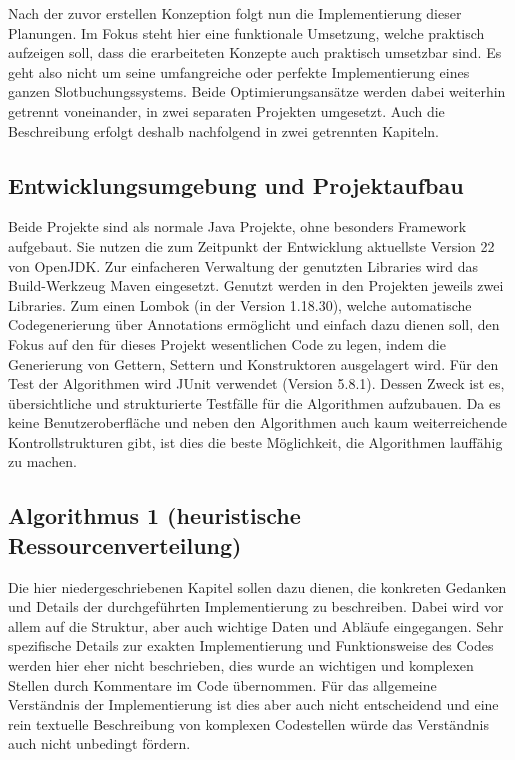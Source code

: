 
Nach der zuvor erstellen Konzeption folgt nun die Implementierung dieser Planungen. Im Fokus steht hier eine funktionale Umsetzung, welche praktisch aufzeigen soll, dass die erarbeiteten Konzepte auch praktisch umsetzbar sind. Es geht also nicht um seine umfangreiche oder perfekte Implementierung eines ganzen Slotbuchungssystems. Beide Optimierungsansätze werden dabei weiterhin getrennt voneinander, in zwei separaten Projekten umgesetzt. Auch die Beschreibung erfolgt deshalb nachfolgend in zwei getrennten Kapiteln.

\subsection{Entwicklungsumgebung und Projektaufbau}

Beide Projekte sind als normale Java Projekte, ohne besonders Framework aufgebaut. Sie nutzen die zum Zeitpunkt der Entwicklung aktuellste Version 22 von OpenJDK. Zur einfacheren Verwaltung der genutzten Libraries wird das Build-Werkzeug Maven eingesetzt. Genutzt werden in den Projekten jeweils zwei Libraries. Zum einen Lombok (in der Version 1.18.30), welche automatische Codegenerierung über Annotations ermöglicht und einfach dazu dienen soll, den Fokus auf den für dieses Projekt wesentlichen Code zu legen, indem die Generierung von Gettern, Settern und Konstruktoren ausgelagert wird. Für den Test der Algorithmen wird JUnit verwendet (Version 5.8.1). Dessen Zweck ist es, übersichtliche und strukturierte Testfälle für die Algorithmen aufzubauen. Da es keine Benutzeroberfläche und neben den Algorithmen auch kaum weiterreichende Kontrollstrukturen gibt, ist dies die beste Möglichkeit, die Algorithmen lauffähig zu machen.


\subsection{Algorithmus 1 (heuristische Ressourcenverteilung)}

Die hier niedergeschriebenen Kapitel sollen dazu dienen, die konkreten Gedanken und Details der durchgeführten Implementierung zu beschreiben. Dabei wird vor allem auf die Struktur, aber auch wichtige Daten und Abläufe eingegangen. Sehr spezifische Details zur exakten Implementierung und Funktionsweise des Codes werden hier eher nicht beschrieben, dies wurde an wichtigen und komplexen Stellen durch Kommentare im Code übernommen. Für das allgemeine Verständnis der Implementierung ist dies aber auch nicht entscheidend und eine rein textuelle Beschreibung von komplexen Codestellen würde das Verständnis auch nicht unbedingt fördern.

